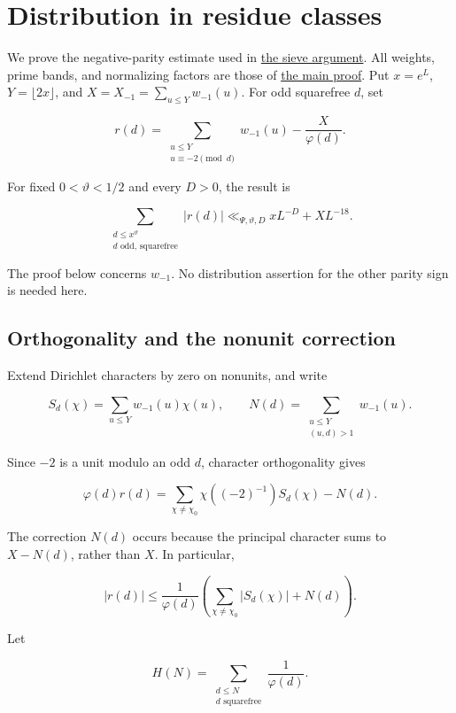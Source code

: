 \hypertarget{congruences}{%
\section{Distribution in residue classes}\label{congruences}}

We prove the negative-parity estimate used in
\protect\hyperlink{sieve}{the sieve argument}. All weights, prime bands,
and normalizing factors are those of \protect\hyperlink{proof}{the main
proof}. Put \(x=e^L\), \(Y=\lfloor2x\rfloor\), and
\(X=X_{-1}=\sum_{u\le Y}w_{-1}(u)\). For odd squarefree \(d\), set

\[
r(d)=\sum_{\substack{u\le Y\\u\equiv-2\pmod d}}w_{-1}(u)
       -\frac X{\varphi(d)}.
\]

For fixed \(0<\vartheta<1/2\) and every \(D>0\), the result is

\[
\sum_{\substack{d\le x^\vartheta\\d\text{ odd, squarefree}}}|r(d)|
 \ll_{\Psi,\vartheta,D}xL^{-D}+XL^{-18}. \tag{G1}
\]

The proof below concerns \(w_{-1}\). No distribution assertion for the
other parity sign is needed here.


\hypertarget{congruences-orthogonality-and-the-nonunit-correction}{%
\subsection{Orthogonality and the nonunit
correction}\label{congruences-orthogonality-and-the-nonunit-correction}}

Extend Dirichlet characters by zero on nonunits, and write

\[
S_d(\chi)=\sum_{u\le Y}w_{-1}(u)\chi(u),\qquad
N(d)=\sum_{\substack{u\le Y\\(u,d)>1}}w_{-1}(u).
\]

Since \(-2\) is a unit modulo an odd \(d\), character orthogonality
gives

\[
\varphi(d)r(d)
 =\sum_{\chi\ne\chi_0}\chi((-2)^{-1})S_d(\chi)-N(d).
 \tag{G2}
\]

The correction \(N(d)\) occurs because the principal character sums to
\(X-N(d)\), rather than \(X\). In particular,

\[
|r(d)|\le\frac1{\varphi(d)}
 \left(\sum_{\chi\ne\chi_0}|S_d(\chi)|+N(d)\right). \tag{G3}
\]

Let

\[
H(N)=\sum_{\substack{d\le N\\d\text{ squarefree}}}\frac1{\varphi(d)}.
\]


